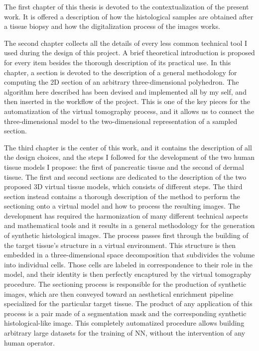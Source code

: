 The first chapter of this thesis is devoted to the contextualization of the present work. It is offered a description of how the histological samples are obtained after a tissue biopsy and how the digitalization process of the images works.

The second chapter collects all the details of every less common technical tool I used during the design of this project. A brief theoretical introduction is proposed for every item besides the thorough description of its practical use. In this chapter, a section is devoted to the description of a general methodology for computing the 2D section of an arbitrary three-dimensional polyhedron. The algorithm here described has been devised and implemented all by my self, and then inserted in the workflow of the project. This is one of the key pieces for the automatization of the virtual tomography process, and it allows us to connect the three-dimensional model to the two-dimensional representation of a sampled section.

The third chapter is the center of this work, and it contains the description of all the design choices, and the steps I followed for the development of the two human tissue models I propose: the first of pancreatic tissue and the second of dermal tissue. The first and second sections are dedicated to the description of the two proposed 3D virtual tissue models, which consists of different steps. The third section instead contains a thorough description of the method to perform the sectioning onto a virtual model and how to process the resulting images. The development has required the harmonization of many different technical aspects and mathematical tools and it results in a general methodology for the generation of synthetic histological images. The process passes first through the building of the target tissue's structure in a virtual environment. This structure is then embedded in a three-dimensional space decomposition that subdivides the volume into individual cells. Those cells are labeled in correspondence to their role in the model, and their identity is then perfectly encaptured by the virtual tomography
procedure. The sectioning process is responsible for the production of synthetic images, which are then conveyed toward an aesthetical enrichment pipeline specialized for the particular target tissue. The product of any application of this process is a pair made of a segmentation mask and the corresponding synthetic histological-like image. This completely automatized procedure allows building arbitrary large datasets for the training of NN, without the intervention of any human operator.

